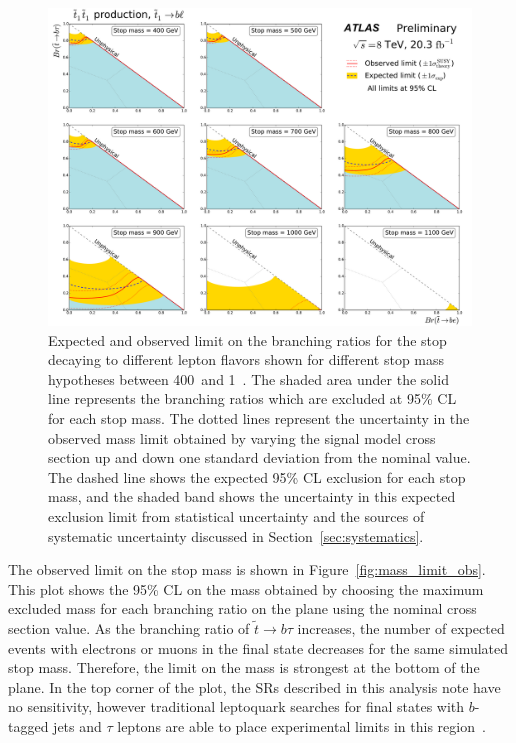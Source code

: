 \begin{figure}[p]
  \centering
  \includegraphics[width=\textwidth]{figs/blstop/limit_contours.pdf}
  \caption{Expected and observed limit on the branching ratios for the stop
    decaying to different lepton flavors shown for different stop mass
    hypotheses between 400~\GeV and 1~\TeV. The shaded area under the solid
    line represents the branching ratios which are excluded at 95\% CL
    for each stop mass.
    The dotted lines represent the uncertainty in the observed mass limit
    obtained by varying the signal model cross section up and down one standard
    deviation from the nominal value. The dashed line shows the
    expected 95\% CL exclusion for each stop mass, and the shaded band shows
    the uncertainty in this expected exclusion limit from statistical
    uncertainty and the sources of systematic uncertainty discussed in
    Section~\ref{sec:systematics}.
  }
  \label{fig:limit_contours}
\end{figure}

The observed limit on the stop mass is shown in Figure~\ref{fig:mass_limit_obs}.
This plot shows the 95\% CL on the mass obtained by choosing
the maximum excluded mass for each branching ratio on the plane using the
nominal cross section value.  
As the branching ratio of $\tilde{t} \rightarrow b\tau$ increases, the number of
expected events with electrons or muons in the final state decreases for the
same simulated stop mass.
Therefore, the limit on the mass is strongest at the bottom of the plane.
In the top corner of the plot, the SRs described in this analysis note have no
sensitivity, however traditional leptoquark searches for final states with
$b$-tagged jets and $\tau$ leptons are able to place experimental limits in this
region~\cite{ATLAS:2013oea}.


